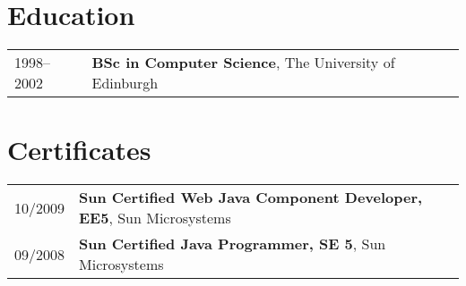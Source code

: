 \documentclass[2pt,a4paper]{article}
\newlength{\datecolumn}
\newlength{\textcolumn}
\begin{document}
\section*{Education}
\begin{tabular}{p{\datecolumn} p{\textcolumn}}
1998--2002 & \textbf{BSc in Computer Science}, The University of Edinburgh \\
\end{tabular}

\section*{Certificates}
\begin{tabular}{p{\datecolumn} p{\textcolumn}}
10/2009 & \textbf{Sun Certified Web Java Component Developer, EE5}, Sun Microsystems \\
09/2008 & \textbf{Sun Certified Java Programmer, SE 5}, Sun Microsystems \\
\end{tabular}
\end{document}
